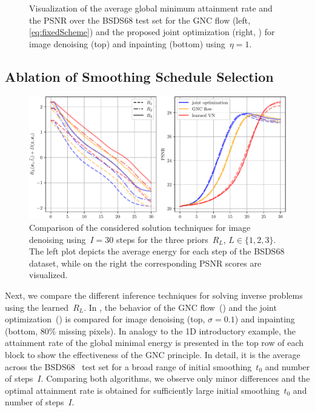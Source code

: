 \documentclass{article}
\theoremstyle{plain}
\theoremstyle{definition}
\theoremstyle{remark}
\begin{document}
\begin{figure}[t!]
\caption{
Visualization of the average global minimum attainment rate and the PSNR over the BSDS68 test set for the GNC flow (left, \eqref{eq:fixedScheme}) and the proposed joint optimization (right, ) for image denoising (top) and inpainting (bottom) using~$\eta=1$.
}
\label{fig:algComparison}
\end{figure}

\subsection{Ablation of Smoothing Schedule Selection}
\begin{figure}[t]
\centering
\includegraphics[width=.9\linewidth]{figures/results/plots_denoise}
\caption{
Comparison of the considered solution techniques for image denoising using~$I=30$ steps for the three priors~$R_L$, $L\in\{1,2,3\}$.
The left plot depicts the average energy for each step of the BSDS68 dataset, while on the right the corresponding PSNR scores are visualized.
}
\label{fig:allThreeComparison}
\end{figure}
Next, we compare the different inference techniques for solving inverse problems using the learned~$R_L$.
In , the behavior of the GNC flow~() and the joint optimization~() is compared for image denoising (top, $\sigma=0.1$) and inpainting (bottom, $80\%$ missing pixels).
In analogy to the 1D introductory example, the attainment rate of the global minimal energy is presented in the top row of each block to show the effectiveness of the GNC principle.
In detail, it is the average across the BSDS68~\cite{MaFo01} test set for a broad range of initial smoothing~$t_0$ and number of steps~$I$.
Comparing both algorithms, we observe only minor differences and the optimal attainment rate is obtained for sufficiently large initial smoothing~$t_0$ and number of steps~$I$.
\end{document}
